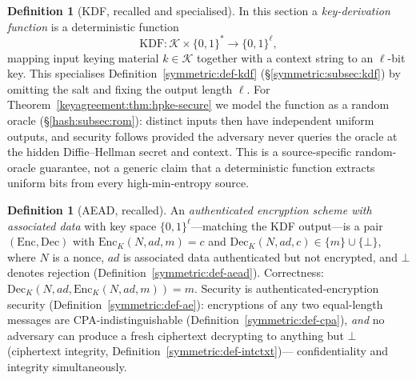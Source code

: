 \documentclass[11pt,a4paper]{article}
\theoremstyle{definition}
\newtheorem{definition}[theorem]{Definition}
\theoremstyle{remark}
\begin{document}
\begin{definition}[KDF, recalled and specialised]
\label{keyagreement:def:kdf}
In this section a \emph{key-derivation function} is a deterministic
function
\[
\mathrm{KDF} \colon \mathcal{K} \times \{0,1\}^{*}
\to \{0,1\}^{\ell},
\]
mapping input keying material \(k \in \mathcal{K}\) together with a
context string to an \(\ell\)-bit key. This specialises
Definition~\ref{symmetric:def-kdf} (\S\ref{symmetric:subsec:kdf})
by omitting the salt and fixing the output length \(\ell\). For
Theorem~\ref{keyagreement:thm:hpke-secure} we model the function as
a random oracle (\S\ref{hash:subsec:rom}): distinct inputs then have
independent uniform outputs, and security follows provided the
adversary never queries the oracle at the hidden Diffie--Hellman
secret and context. This is a source-specific random-oracle
guarantee, not a generic claim that a deterministic function
extracts uniform bits from every high-min-entropy source.
\end{definition}

\begin{definition}[AEAD, recalled]
\label{keyagreement:def:aead}
An \emph{authenticated encryption scheme with associated data} with
key space \(\{0,1\}^{\ell}\)---matching the KDF output---is a pair
\((\mathrm{Enc}, \mathrm{Dec})\) with
\(\mathrm{Enc}_{K}(N, \mathit{ad}, m) = c\) and
\(\mathrm{Dec}_{K}(N, \mathit{ad}, c) \in \{m\} \cup \{\bot\}\),
where \(N\) is a nonce, \(\mathit{ad}\) is associated data
authenticated but not encrypted, and \(\bot\) denotes rejection
(Definition~\ref{symmetric:def-aead}). Correctness:
\(\mathrm{Dec}_{K}(N, \mathit{ad},
\mathrm{Enc}_{K}(N, \mathit{ad}, m)) = m\). Security is
authenticated-encryption security
(Definition~\ref{symmetric:def-ae}): encryptions of any two
equal-length messages are CPA-indistinguishable
(Definition~\ref{symmetric:def-cpa}), \emph{and} no adversary can
produce a fresh ciphertext decrypting to anything but \(\bot\)
(ciphertext integrity, Definition~\ref{symmetric:def-intctxt})---
confidentiality and integrity simultaneously.
\end{definition}
\end{document}
